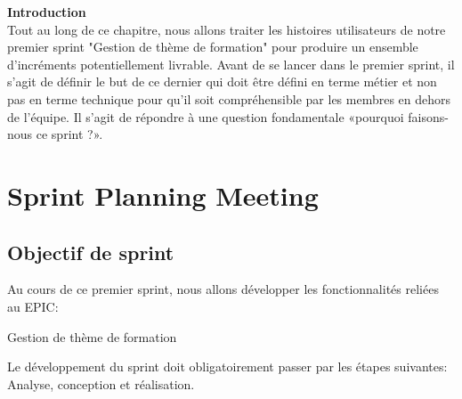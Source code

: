 
\textbf{Introduction}\\

Tout au long de ce chapitre, nous allons traiter
les histoires utilisateurs de notre premier sprint "Gestion de thème de formation" pour produire un ensemble d’incréments potentiellement
livrable. Avant de se lancer dans le premier sprint, il s'agit de définir le but de ce dernier qui doit
être défini en terme métier et non pas en terme technique pour qu’il soit compréhensible par les membres
en dehors de l’équipe. Il s’agit de répondre à une question fondamentale «pourquoi faisons-nous
ce sprint ?».

\section{Sprint Planning Meeting}
\subsection{Objectif de sprint}
Au cours de ce premier sprint, nous allons développer les fonctionnalités reliées au EPIC:

	 Gestion de thème de formation

Le développement du sprint doit obligatoirement passer par les étapes suivantes: Analyse, conception et réalisation.

